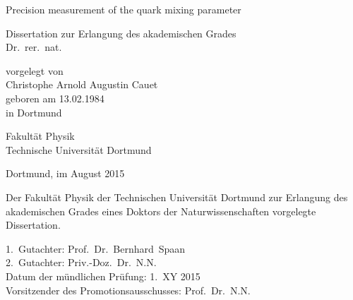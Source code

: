 
\begin{titlepage}

\vspace*{20ex}

{%
\Huge \sffamily \bfseries 
\begin{center}
  Precision measurement of the quark mixing parameter \sintwobetabfsf
\end{center} 
}%

\begin{german}
{%
\LARGE \sffamily %
\begin{center}
  Dissertation zur Erlangung des akademischen Grades\\
  Dr.~rer.~nat.
\end{center}
}

\vspace{5ex}

{%
\Large \rmfamily
\begin{center}
  vorgelegt von \\ [0.8ex]
  Christophe Arnold Augustin Cauet \\ [0.8ex]
  geboren am 13.02.1984 \\
  in Dortmund
\end{center}
}

\vspace{5ex}

{%
\Large \rmfamily
\begin{center}
  Fakultät Physik\\
  Technische Universität Dortmund
\end{center}
}

\vspace{4ex}

{%
\Large \rmfamily
\begin{center}
  Dortmund, im August 2015
\end{center}
}

\clearpage
\thispagestyle{empty}
\vspace*{\fill}
\noindent Der Fakultät Physik der Technischen Universität Dortmund zur Erlangung
des akademischen Grades eines Doktors der Naturwissenschaften vorgelegte
Dissertation.\\

\parbox{0.90\textwidth}{
  1.~Gutachter: Prof.~Dr.~Bernhard~Spaan \\
  2.~Gutachter: Priv.-Doz.~Dr.~N.N.\\
  Datum der mündlichen Prüfung: 1.~XY 2015\\
  Vorsitzender des Promotionsausschusses: Prof.~Dr.~N.N.
}
\end{german}
\end{titlepage}

